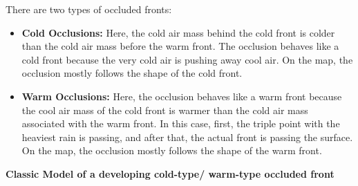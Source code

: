\documentclass[12pt,oneside]{book}
\providecommand{\tightlist}{%
  \setlength{\itemsep}{0pt}\setlength{\parskip}{0pt}}
\begin{document}
There are two types of occluded fronts:

\begin{itemize}
\tightlist
\item
  \textbf{Cold Occlusions:} Here, the cold air mass behind the cold
  front is colder than the cold air mass before the warm front. The
  occlusion behaves like a cold front because the very cold air is
  pushing away cool air. On the map, the occlusion mostly follows the
  shape of the cold front.
\item
  \textbf{Warm Occlusions:} Here, the occlusion behaves like a warm
  front because the cool air mass of the cold front is warmer than the
  cold air mass associated with the warm front. In this case, first, the
  triple point with the heaviest rain is passing, and after that, the
  actual front is passing the surface. On the map, the occlusion mostly
  follows the shape of the warm front.
\end{itemize}

\textbf{Classic Model of a developing cold-type/ warm-type occluded
front}
\end{document}
